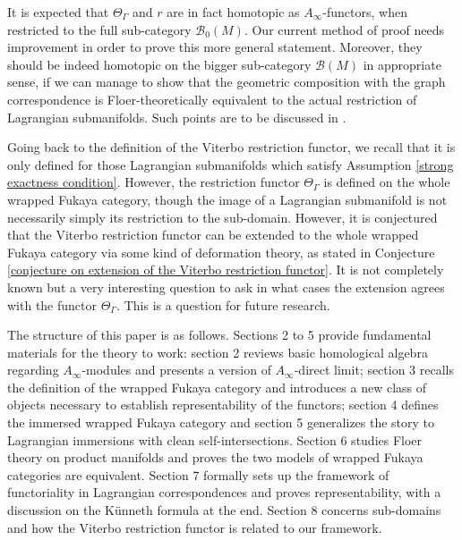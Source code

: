 \documentclass{amsart}
\numberwithin{equation}{section}
\numberwithin{figure}{section}
\begin{document}
	It is expected that $\Theta_{\Gamma}$ and $r$ are in fact homotopic as $A_{\infty}$-functors, when restricted to the full sub-category $\mathcal{B}_{0}(M)$. Our current method of proof needs improvement in order to prove this more general statement. Moreover, they should be indeed homotopic on the bigger sub-category $\mathcal{B}(M)$ in appropriate sense, if we can manage to show that the geometric composition with the graph correspondence is Floer-theoretically equivalent to the actual restriction of Lagrangian submanifolds. Such points are to be discussed in \cite{Gao2}. \par
	Going back to the definition of the Viterbo restriction functor, we recall that it is only defined for those Lagrangian submanifolds which satisfy Assumption \ref{strong exactness condition}. However, the restriction functor $\Theta_{\Gamma}$ is defined on the whole wrapped Fukaya category, though the image of a Lagrangian submanifold is not necessarily simply its restriction to the sub-domain. However, it is conjectured that the Viterbo restriction functor can be extended to the whole wrapped Fukaya category via some kind of deformation theory, as stated in Conjecture \ref{conjecture on extension of the Viterbo restriction functor}. It is not completely known but a very interesting question to ask in what cases the extension agrees with the functor $\Theta_{\Gamma}$. This is a question for future research. \par

	The structure of this paper is as follows. Sections 2 to 5 provide fundamental materials for the theory to work: section 2 reviews basic homological algebra regarding $A_{\infty}$-modules and presents a version of $A_{\infty}$-direct limit; section 3 recalls the definition of the wrapped Fukaya category and introduces a new class of objects necessary to establish representability of the functors; section 4 defines the immersed wrapped Fukaya category and section 5 generalizes the story to Lagrangian immersions with clean self-intersections. Section 6 studies Floer theory on product manifolds and proves the two models of wrapped Fukaya categories are equivalent. Section 7 formally sets up the framework of functoriality in Lagrangian correspondences and proves representability, with a discussion on the K\"{u}nneth formula at the end. Section 8 concerns sub-domains and how the Viterbo restriction functor is related to our framework. \par
	
\end{document}
